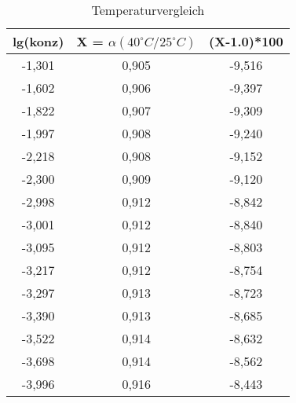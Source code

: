 \begin{table}[H]
  \centering
  \caption{Temperaturvergleich}
    \begin{tabular}{ccc}
    \toprule
    \multicolumn{1}{c}{\textbf{lg(konz)}} & {\boldmath{}\textbf{\qquad X =  $\alpha (40^\circ C/25^\circ C)$}\unboldmath{}} & \multicolumn{1}{c}{\textbf{(X-1.0)*100}} \\
    \midrule
    -1,301 & 0,905 & -9,516 \\
    -1,602 & 0,906 & -9,397 \\
    -1,822 & 0,907 & -9,309 \\
    -1,997 & 0,908 & -9,240 \\
    -2,218 & 0,908 & -9,152 \\
    -2,300 & 0,909 & -9,120 \\
    -2,998 & 0,912 & -8,842 \\
    -3,001 & 0,912 & -8,840 \\
    -3,095 & 0,912 & -8,803 \\
    -3,217 & 0,912 & -8,754 \\
    -3,297 & 0,913 & -8,723 \\
    -3,390 & 0,913 & -8,685 \\
    -3,522 & 0,914 & -8,632 \\
    -3,698 & 0,914 & -8,562 \\
    -3,996 & 0,916 & -8,443 \\
    \bottomrule
    \end{tabular}%
  \label{tab:addlabel}%
\end{table}%
